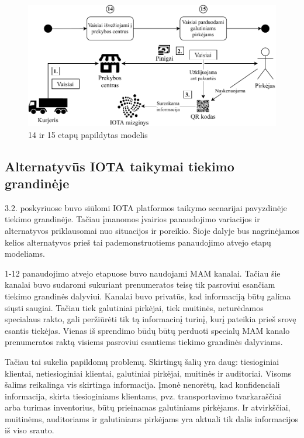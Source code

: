 \begin{figure}[H]
    \centering
    \includegraphics[scale=0.8]{images/iota-usecase-14-15}
    \caption{14 ir 15 etapų papildytas modelis}
    \label{img:19}
\end{figure}




\subsection{Alternatyvūs IOTA taikymai tiekimo grandinėje} \label{subsection:uc-alt}

3.2. poskyriuose buvo siūlomi IOTA platformos taikymo scenarijai pavyzdinėje tiekimo grandinėje. Tačiau įmanomos įvairios panaudojimo variacijos ir alternatyvos priklausomai nuo situacijos ir poreikio. Šioje dalyje bus nagrinėjamos kelios alternatyvos prieš tai pademonstruotiems panaudojimo atvejo etapų modeliams.

1-12 panaudojimo atvejo etapuose buvo naudojami MAM kanalai. Tačiau šie kanalai buvo sudaromi sukuriant prenumeratos teisę tik pasroviui esančiam tiekimo grandinės dalyviui. Kanalai buvo privatūs, kad informaciją būtų galima siųsti saugiai. Tačiau tiek galutiniai pirkėjai, tiek muitinės, neturėdamos specialaus rakto, gali peržiūrėti tik tą informacinį turinį, kurį pateikia prieš srovę esantis tiekėjas. Vienas iš sprendimo būdų būtų perduoti specialų MAM kanalo prenumeratos raktą visiems pasroviui esantiems tiekimo grandinės dalyviams.

Tačiau tai sukelia papildomų problemų. Skirtingų šalių yra daug: tiesioginiai klientai, netiesioginiai klientai, galutiniai pirkėjai, muitinės ir auditoriai. Visoms šalims reikalinga vis skirtinga informacija. Įmonė nenorėtų, kad konfidenciali informacija, skirta tiesioginiams klientams, pvz. transportavimo tvarkaraščiai arba turimas inventorius, būtų prieinamas galutiniams pirkėjams. Ir atvirkščiai, muitinėms, auditoriams ir galutiniams pirkėjams yra aktuali tik dalis informacijos iš viso srauto.

